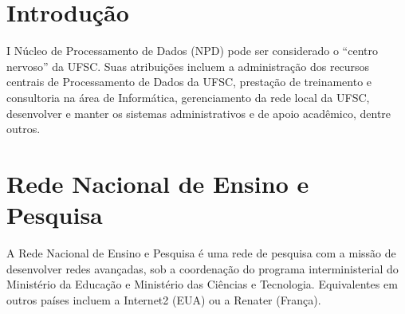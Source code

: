 \documentclass[brazil,times]{abnt}
\begin{document}






\capa

\folhaderosto


\section*{Introdução}
I Núcleo de Processamento de Dados (NPD) pode ser considerado o ``centro
nervoso'' da UFSC. Suas atribuições incluem a administração dos recursos centrais de Processamento de
Dados da UFSC, prestação de treinamento e consultoria na área de Informática,
gerenciamento da rede local da UFSC, desenvolver e manter os sistemas
administrativos e de apoio acadêmico, dentre outros.\cite{home-setic}

\section*{Rede Nacional de Ensino e Pesquisa}
A Rede Nacional de Ensino e Pesquisa é uma rede de pesquisa com a missão de
desenvolver redes avançadas, sob a coordenação do programa interministerial do
Ministério da Educação e Ministério das Ciências e Tecnologia. Equivalentes em
outros países incluem a Internet2 (EUA) ou a Renater (França).\cite{apresentacao-rnp}
\end{document}
